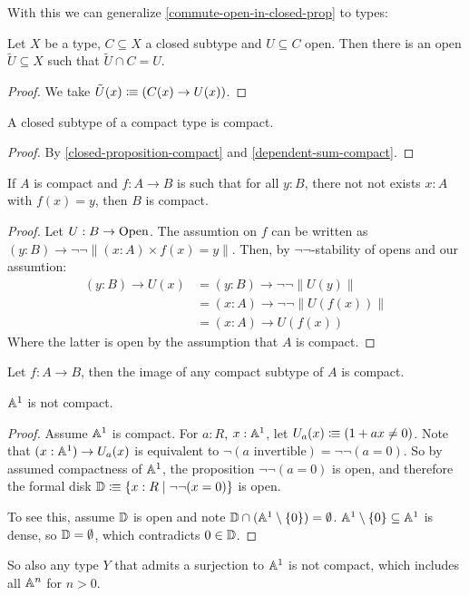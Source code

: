 With this we can generalize \cref{commute-open-in-closed-prop} to types:

\begin{proposition}
  \label{commute-open-in-closed}
  Let $X$ be a type, $C\subseteq X$ a closed subtype and $U\subseteq C$ open.
  Then there is an open $\tilde{U}\subseteq X$ such that $\tilde{U}\cap C = U$.
\end{proposition}

\begin{proof}
  We take $\tilde{U}(x)\vcentcolon\mspace{-1.2mu}\equiv (C(x)\to U(x))$.
\end{proof}

\begin{lemma}
  \label{closed-subtype-compact}
  A closed subtype of a compact type is compact.
\end{lemma}

\begin{proof}
  By \cref{closed-proposition-compact} and \cref{dependent-sum-compact}.
\end{proof}

\begin{lemma}
  \label{not-not-surjection-compact}
  If $A$ is compact and $f:A\to B$ is such that for all $y:B$,
  there not not exists $x:A$ with $f(x)=y$,
  then $B$ is compact.
\end{lemma}

\begin{proof}
  Let $U:B\to\mathrm{Open}$.
  The assumtion on $f$ can be written as $(y:B)\to \neg\neg \| (x:A)\times f(x)=y \|$.
  Then, by $\neg\neg$-stability of opens and our assumtion:
  \begin{align*}
    (y:B)\to U(x) &= (y:B)\to \neg\neg \| U(y) \| \\
                  &= (x:A)\to \neg\neg \| U(f(x)) \| \\
                  &= (x:A)\to U(f(x))
  \end{align*}
  Where the latter is open by the assumption that $A$ is compact.
\end{proof}

\begin{corollary}
  \label{image-compact}
  Let $f:A\to B$, then the image of any compact subtype of $A$ is compact.
\end{corollary}

\begin{proposition}
  $\mathbb{A}^1$ is not compact.
\end{proposition}

\begin{proof}
  Assume $\mathbb{A}^1$ is compact.
  For $a:R$, $x:\mathbb{A}^1$, let $U_a(x)\vcentcolon\mspace{-1.2mu}\equiv (1+ax \neq 0)$.
  Note that $(x:\mathbb{A}^1)\to U_a(x)$ is equivalent to $\neg(\text{$a$ invertible})=\neg\neg(a=0)$.
  So by assumed compactness of $\mathbb{A}^1$, the proposition $\neg\neg(a=0)$ is open,
  and therefore the formal disk $\mathbb{D}\vcentcolon\mspace{-1.2mu}\equiv \{x:R\mid \neg\neg(x=0)\}$ is open.

  To see this, assume $\mathbb{D}$ is open and note $\mathbb{D}\cap (\mathbb{A}^1\setminus\{0\})=\emptyset$.
  $\mathbb{A}^1\setminus\{0\}\subseteq \mathbb{A}^1$ is dense, so $\mathbb{D}=\emptyset$, which contradicts $0\in\mathbb{D}$.
\end{proof}

So also any type $Y$ that admits a surjection to $\mathbb{A}^1$ is not compact, which includes all $\mathbb{A}^n$ for $n>0$.